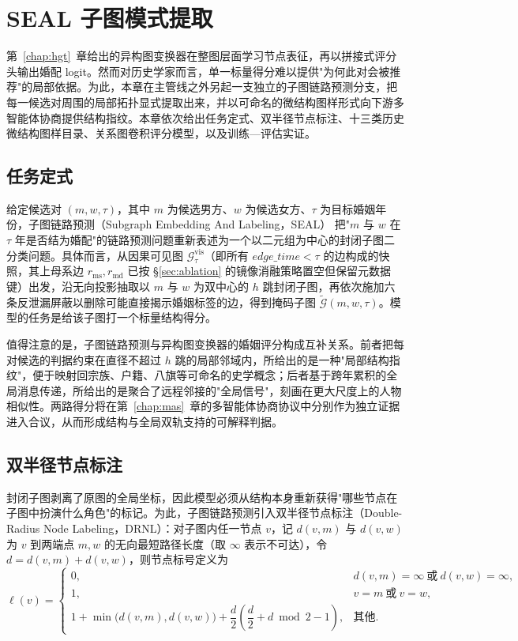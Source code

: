 \chapter{SEAL 子图模式提取}\label{chap:seal}

第~\ref{chap:hgt}~章给出的异构图变换器在整图层面学习节点表征，再以拼接式评分头输出婚配 logit。然而对历史学家而言，单一标量得分难以提供"为何此对会被推荐"的局部依据。为此，本章在主管线之外另起一支独立的子图链路预测分支，把每一候选对周围的局部拓扑显式提取出来，并以可命名的微结构图样形式向下游多智能体协商提供结构指纹。本章依次给出任务定式、双半径节点标注、十三类历史微结构图样目录、关系图卷积评分模型，以及训练—评估实证。

\section{任务定式}\label{sec:seal-formulation}

给定候选对 $(m,w,\tau)$，其中 $m$ 为候选男方、$w$ 为候选女方、$\tau$ 为目标婚姻年份，子图链路预测（Subgraph Embedding And Labeling，SEAL）\citep{zhang2018seal} 把"$m$ 与 $w$ 在 $\tau$ 年是否结为婚配"的链路预测问题重新表述为一个以二元组为中心的封闭子图二分类问题。具体而言，从因果可见图 $\mathcal{G}^{\mathrm{vis}}_\tau$（即所有 $\mathit{edge\_time}<\tau$ 的边构成的快照，其上母系边 $r_\mathrm{ms}, r_\mathrm{md}$ 已按 \S\ref{sec:ablation} 的镜像消融策略置空但保留元数据键）出发，沿无向投影抽取以 $m$ 与 $w$ 为双中心的 $h$ 跳封闭子图，再依次施加六条反泄漏屏蔽以删除可能直接揭示婚姻标签的边，得到掩码子图 $\widetilde{\mathcal{G}}(m,w,\tau)$。模型的任务是给该子图打一个标量结构得分。

值得注意的是，子图链路预测与异构图变换器的婚姻评分构成互补关系。前者把每对候选的判据约束在直径不超过 $h$ 跳的局部邻域内，所给出的是一种"局部结构指纹"，便于映射回宗族、户籍、八旗等可命名的史学概念；后者基于跨年累积的全局消息传递，所给出的是聚合了远程邻接的"全局信号"，刻画在更大尺度上的人物相似性。两路得分将在第~\ref{chap:mas}~章的多智能体协商协议中分别作为独立证据进入合议，从而形成结构与全局双轨支持的可解释判据。

\section{双半径节点标注}\label{sec:seal-drnl}

封闭子图剥离了原图的全局坐标，因此模型必须从结构本身重新获得"哪些节点在子图中扮演什么角色"的标记。为此，子图链路预测引入双半径节点标注（Double-Radius Node Labeling，DRNL）：对子图内任一节点 $v$，记 $d(v,m)$ 与 $d(v,w)$ 为 $v$ 到两端点 $m,w$ 的无向最短路径长度（取 $\infty$ 表示不可达），令 $d=d(v,m)+d(v,w)$，则节点标号定义为
\begin{equation}\label{eq:drnl}
\ell(v)=
\begin{cases}
0, & d(v,m)=\infty\ \text{或}\ d(v,w)=\infty,\\[3pt]
1, & v=m\ \text{或}\ v=w,\\[3pt]
1+\min\!\big(d(v,m),d(v,w)\big)+\dfrac{d}{2}\!\left(\dfrac{d}{2}+d\bmod 2-1\right), & \text{其他}.
\end{cases}
\end{equation}

